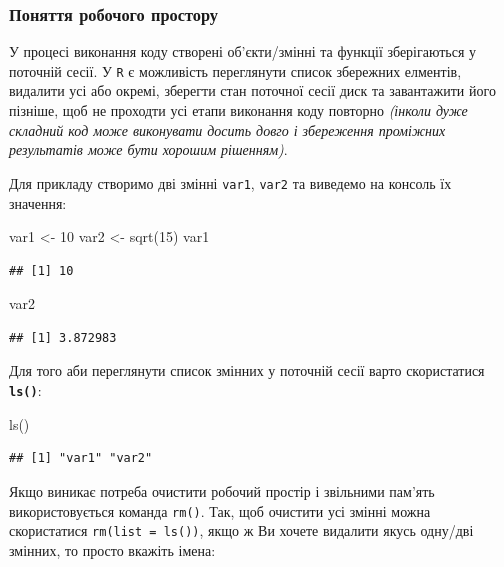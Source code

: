 \documentclass[
]{book}
\newenvironment{Shaded}{\begin{snugshade}}{\end{snugshade}}
\newcommand{\DecValTok}[1]{\textcolor[rgb]{0.00,0.00,0.81}{#1}}
\newcommand{\FunctionTok}[1]{\textcolor[rgb]{0.00,0.00,0.00}{#1}}
\newcommand{\NormalTok}[1]{#1}
\newcommand{\OtherTok}[1]{\textcolor[rgb]{0.56,0.35,0.01}{#1}}
\begin{document}
\hypertarget{chapter1313}{%
\subsubsection{Поняття робочого простору}\label{chapter1313}}

У процесі виконання коду створені об'єкти/змінні та функції зберігаються у поточній сесії. У \texttt{R} є можливість переглянути список збережних елментів, видалити усі або окремі, зберегти стан поточної сесії диск та завантажити його пізніше, щоб не проходти усі етапи виконання коду повторно \emph{(інколи дуже складний код може виконувати досить довго і збереження проміжних результатів може бути хорошим рішенням)}.

Для прикладу створимо дві змінні \texttt{var1}, \texttt{var2} та виведемо на консоль їх значення:

\begin{Shaded}
\begin{Highlighting}[]
\NormalTok{var1 }\OtherTok{\textless{}{-}} \DecValTok{10}
\NormalTok{var2 }\OtherTok{\textless{}{-}} \FunctionTok{sqrt}\NormalTok{(}\DecValTok{15}\NormalTok{)}
\NormalTok{var1}
\end{Highlighting}
\end{Shaded}

\begin{verbatim}
## [1] 10
\end{verbatim}

\begin{Shaded}
\begin{Highlighting}[]
\NormalTok{var2}
\end{Highlighting}
\end{Shaded}

\begin{verbatim}
## [1] 3.872983
\end{verbatim}

Для того аби переглянути список змінних у поточній сесії варто скористатися \textbf{\texttt{ls()}}:

\begin{Shaded}
\begin{Highlighting}[]
\FunctionTok{ls}\NormalTok{()}
\end{Highlighting}
\end{Shaded}

\begin{verbatim}
## [1] "var1" "var2"
\end{verbatim}

Якщо виникає потреба очистити робочий простір і звільними пам'ять використовується команда \texttt{rm()}. Так, щоб очистити усі змінні можна скористатися \texttt{rm(list\ =\ ls())}, якщо ж Ви хочете видалити якусь одну/дві змінних, то просто вкажіть імена:
\end{document}
